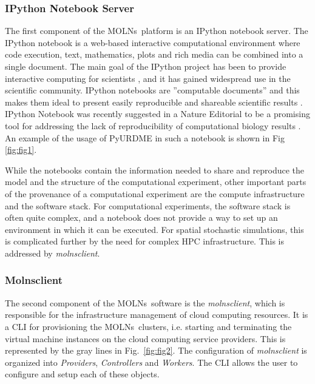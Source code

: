 \documentclass[final,leqno,onefignum,onetabnum]{siamltex1213}
\def\packagename {MOLNs}
\begin{document}
\subsubsection{IPython Notebook Server}
\label{sec:ipython}
The first component of the \packagename~platform is an IPython notebook server. 
The IPython notebook is a web-based interactive computational environment where code execution, text, mathematics, plots and rich media can be combined into a single document. The main goal of the IPython project has been to provide interactive computing for scientists \cite{ipython}, and it has gained widespread use in the scientific community. IPython notebooks are ''computable documents'' and this makes them ideal to present easily reproducible and shareable scientific results \cite{ragan2013collaborative}. IPython Notebook was recently suggested in a Nature Editorial to be a promising tool for addressing the lack of reproducibility of computational biology results \cite{shen2014}. An example of the usage of PyURDME in such a notebook is shown in Fig \ref{fig:fig1}. 

While the notebooks contain the information needed to share and reproduce the model and the structure of the computational experiment, other important parts of the provenance of a computational experiment are the compute infrastructure and the software stack. For computational experiments, the software stack is often quite complex, and a notebook does not provide a way to set up an environment in which it can be executed. For spatial stochastic simulations, this is complicated further by the need for complex HPC infrastructure. This is addressed by \emph{molnsclient}.

\subsubsection{Molnsclient}
\label{sec:molns}
The second component of the \packagename~software is the \emph{molnsclient}, which is responsible for the infrastructure management of cloud computing resources.  It is a CLI for provisioning the \packagename~clusters, i.e. starting and terminating the virtual machine instances on the cloud computing service providers.  This is represented by the gray lines in Fig.~\ref{fig:fig2}.
The configuration of \emph{molnsclient} is organized into \emph{Providers}, \emph{Controllers} and \emph{Workers}. The CLI allows the user to configure and setup each of these objects.
\end{document}
